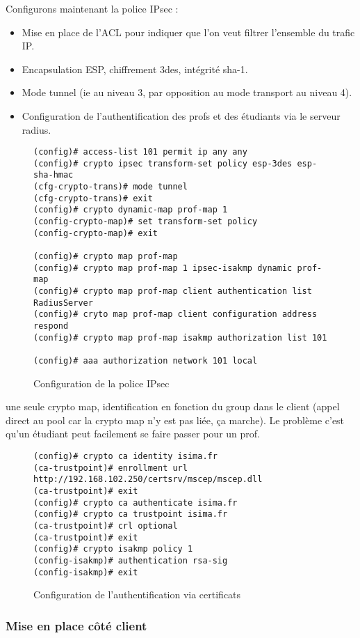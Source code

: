 
Configurons maintenant la police IPsec :
\begin{itemize}
	\item Mise en place de l'ACL pour indiquer que l'on veut filtrer l'ensemble du trafic IP.
	\item Encapsulation ESP, chiffrement 3des, intégrité sha-1.
	\item Mode tunnel (ie au niveau 3, par opposition au mode transport au niveau 4).
	\item Configuration de l'authentification des profs et des étudiants via le serveur radius.
\end{itemize}

\begin{figure}[H]
	\begin{center}
		\begin{minipage}{1\textwidth}
			\begin{lstlisting}[frame=trBL]
(config)# access-list 101 permit ip any any
(config)# crypto ipsec transform-set policy esp-3des esp-sha-hmac
(cfg-crypto-trans)# mode tunnel
(cfg-crypto-trans)# exit
(config)# crypto dynamic-map prof-map 1
(config-crypto-map)# set transform-set policy
(config-crypto-map)# exit

(config)# crypto map prof-map
(config)# crypto map prof-map 1 ipsec-isakmp dynamic prof-map
(config)# crypto map prof-map client authentication list RadiusServer
(config)# cryto map prof-map client configuration address respond
(config)# crypto map prof-map isakmp authorization list 101

(config)# aaa authorization network 101 local
			\end{lstlisting}
		\end{minipage}
	\end{center}
	\caption{Configuration de la police IPsec}
	\label{configuration_police_ipsec}
\end{figure}

une seule crypto map, identification en fonction du group dans le client (appel direct au pool car la crypto map n'y est pas liée, ça marche). Le problème c'est qu'un étudiant peut facilement se faire passer pour un prof.

\begin{figure}[H]
	\begin{center}
		\begin{minipage}{1\textwidth}
			\begin{lstlisting}[frame=trBL]
(config)# crypto ca identity isima.fr
(ca-trustpoint)# enrollment url
http://192.168.102.250/certsrv/mscep/mscep.dll
(ca-trustpoint)# exit
(config)# crypto ca authenticate isima.fr
(config)# crypto ca trustpoint isima.fr
(ca-trustpoint)# crl optional
(ca-trustpoint)# exit
(config)# crypto isakmp policy 1
(config-isakmp)# authentication rsa-sig
(config-isakmp)# exit
			\end{lstlisting}
		\end{minipage}
	\end{center}
	\caption{Configuration de l'authentification via certificats}
	\label{configuration_authentification_certificats}
\end{figure}

\subsubsection{Mise en place côté client}


